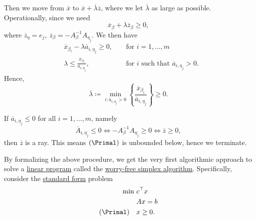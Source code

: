 \begin{enumerate}[(a)]
	      Then we move from \(\overline{x}\) to \(\overline{x}+\overline{\lambda} \overline{z}\), where we let \(\overline{\lambda}\) as large as possible.
	      Operationally, since we need
	      \[
		      \overline{x}_{\beta} + \lambda \overline{z}_{\beta} \geq 0,
	      \]
	      where \(\overline{z}_{\eta} = e_{j},\ \overline{z}_{\beta} = -A^{-1}_{\beta}A_{\eta_{j}}\). We then have
	      \[
		      \begin{alignedat}{3}
			       & \overline{x}_{\beta_{i}} - \lambda \overline{a}_{i, \eta_{j}}\geq 0,      &  & \text{ for }i = 1, \dots , m                                \\
			       & \lambda \leq \frac{\overline{x}_{\beta_{i}}}{\overline{a}_{i, \eta_{j}}}, &  & \text{ for }i \text{ such that }\overline{a}_{i, \eta_j}>0.
		      \end{alignedat}
	      \]
	      Hence,
	      \[
		      \overline{\lambda} \coloneqq \min_{i: \overline{a}_{i, \eta_{j}}>0} \left\{ \frac{\overline{x}_{\beta_{i}}}{\overline{a}_{i, \eta_{j}}} \right\} \geq 0.
	      \]
	      \begin{remark}
		      If \(\overline{a}_{i, \eta_{j}}\leq 0\) for all \(i = 1, \dots , m\), namely
		      \[
			      \overline{A}_{i, \eta_{j}}\leq 0 \iff -A^{-1}_{\beta}A_{\eta_{j}}\geq 0 \iff \overline{z}\geq 0,
		      \]
		      then \(\overline{z}\) is a ray. This means \((\Primal)\) is unbounded below, hence we terminate.
	      \end{remark}
\end{enumerate}

By formalizing the above procedure, we get the very first algorithmic approach to solve a \hyperref[def:general-linear-programming-problem]{linear program} called the \hyperref[algo:worry-free-simplex-algorithm]{worry-free simplex algorithm}. Specifically, consider the \hyperref[def:standard-form]{standard form} problem
\[
	\begin{aligned}
		\min~          & c^{\top}x \\
		               & Ax = b    \\
		(\Primal)\quad & x\geq  0.
	\end{aligned}
\]

